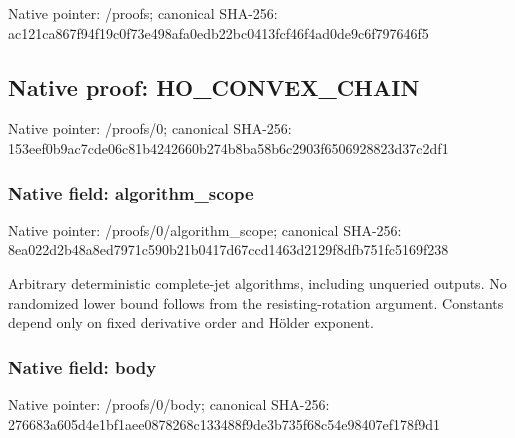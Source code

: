 \documentclass[10pt,a4paper]{article}
\begin{document}
Native pointer: /proofs; canonical SHA-256: ac121ca867f94f19c0f73e498afa0edb22bc0413fcf46f4ad0de9c6f797646f5

\subsection{Native proof: HO\_\allowbreak{}CONVEX\_\allowbreak{}CHAIN}
Native pointer: /proofs/0; canonical SHA-256: 153eef0b9ac7cde06c81b4242660b274b8ba58b6c2903f6506928823d37c2df1

\subsubsection{Native field: algorithm\_\allowbreak{}scope}
Native pointer: /proofs/0/algorithm\_\allowbreak{}scope; canonical SHA-256: 8ea022d2b48a8ed7971c590b21b0417d67ccd1463d2129f8dfb751fc5169f238

\begingroup\raggedright\sloppy Arbitrary deterministic complete-jet algorithms,\allowbreak{} including unqueried outputs. No randomized lower bound follows from the resisting-rotation argument. Constants depend only on fixed derivative order and H{\AtlasUnicodeText ö}\allowbreak{}lder exponent.\par\endgroup

\subsubsection{Native field: body}
Native pointer: /proofs/0/body; canonical SHA-256: 276683a605d4e1bf1aee0878268c133488f9de3b735f68c54e98407ef178f9d1
\end{document}

